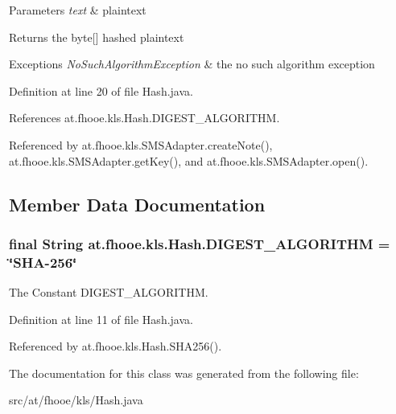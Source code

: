 \begin{DoxyParams}{Parameters}
{\em text} & plaintext \\
\hline
\end{DoxyParams}
\begin{DoxyReturn}{Returns}
the byte\mbox{[}\mbox{]} hashed plaintext 
\end{DoxyReturn}

\begin{DoxyExceptions}{Exceptions}
{\em No\-Such\-Algorithm\-Exception} & the no such algorithm exception \\
\hline
\end{DoxyExceptions}


Definition at line 20 of file Hash.\-java.



References at.\-fhooe.\-kls.\-Hash.\-D\-I\-G\-E\-S\-T\-\_\-\-A\-L\-G\-O\-R\-I\-T\-H\-M.



Referenced by at.\-fhooe.\-kls.\-S\-M\-S\-Adapter.\-create\-Note(), at.\-fhooe.\-kls.\-S\-M\-S\-Adapter.\-get\-Key(), and at.\-fhooe.\-kls.\-S\-M\-S\-Adapter.\-open().



\subsection{Member Data Documentation}
\hypertarget{classat_1_1fhooe_1_1kls_1_1_hash_a0ebae14d3fcc7b73e68381c21e49b52c}{
\subsubsection[{D\-I\-G\-E\-S\-T\-\_\-\-A\-L\-G\-O\-R\-I\-T\-H\-M}]{\setlength{\rightskip}{0pt plus 5cm}final String at.\-fhooe.\-kls.\-Hash.\-D\-I\-G\-E\-S\-T\-\_\-\-A\-L\-G\-O\-R\-I\-T\-H\-M = \char`\"{}S\-H\-A-\/256\char`\"{}\hspace{0.3cm}{\ttfamily [static]}}}\label{classat_1_1fhooe_1_1kls_1_1_hash_a0ebae14d3fcc7b73e68381c21e49b52c}
The Constant D\-I\-G\-E\-S\-T\-\_\-\-A\-L\-G\-O\-R\-I\-T\-H\-M. 

Definition at line 11 of file Hash.\-java.



Referenced by at.\-fhooe.\-kls.\-Hash.\-S\-H\-A256().



The documentation for this class was generated from the following file\-:\begin{DoxyCompactItemize}
\item 
src/at/fhooe/kls/Hash.\-java\end{DoxyCompactItemize}

